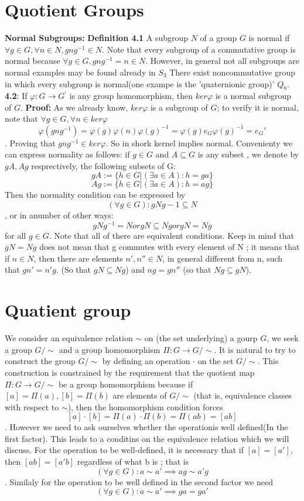 \section{Quotient Groups}
\textbf{Normal Subgroups:}
\textbf{Definition 4.1} A subgroup $N$ of a group $G$ is normal if $\forall g \in G, \forall n \in N, gng^{-1} \in N.$
Note that every subgroup of a commutative group is normal because
$\forall g \in G, gng^{-1} = n \in N$. However, in general not all subgroups are normal examples may be found already in $S_3$
There exist noncommutative group in which every subgroup is normal(one exampe is the 'quaternionic group)' $Q_8$.
\textbf{4.2}: If $\varphi : G \to G^\prime$ is any group homomorphism, then $ker\varphi$ is a normal subgroup of $G$.
\textbf{Proof:}
As we already know, $ker \varphi$ is a subgroup of $G$; to verify it is normal, note that $\forall g \in G, \forall n \in ker\varphi$
$$\varphi(gng^{-1}) = \varphi(g)\varphi(n)\varphi(g)^{-1} = \varphi(g)e_G\varphi(g)^{-1} = e_G\prime$$. Proving that $gng^{-1} \in ker\varphi$. So in shork kernel implies normal.
Convenienty we can express normality as follows: if $g\in G$ and $A \subseteq G $ is any subset , we denote by $gA,Ag$ resprectively, the following subsets of G:
$$gA := \{h\in G | (\exists a \in A): h = ga\}$$ $$Ag := \{h\in G | (\exists a \in A): h = ag\}$$
Then the normality condition can be expressed by $$(\forall g \in G): gNg-1 \subseteq N$$, or in anumber of other ways:
$$gNg^{-1} = N or  gN \subseteq Ng or gN = Ng$$ for all $g\in G$. Note that all of there are equivalent conditions. Keep in mind that $gN = Ng$ does not mean that g commutes with every element of N ; it means that if $n \in N$, then there are elements $n',n'' \in N$, in general different from n, such that $gn' = n'g$. (So that $gN \subseteq Ng$) and $ng = gn''$ (so that $Ng \subseteq gN$).

\section{Quatient group}
We consider an equivalence relation $\sim$ on (the set underlying) a gourp $G$, we seek a group $G/\sim$ and a group homomorphism $\varPi : G \to G/\sim.$
It is natural to try to construct the group $G/\sim$ by defining an operation $\cdot$ on the set $G/\sim$. This construction is constrained by the requirement that the quotient map $\varPi: G \to G/\sim$ be a group homomorphism
because if $[a] = \varPi(a), [b] = \varPi(b)$ are elements of $G/\sim$ (that is, equivalence classes with respect to $\sim$), then the homomorphism condition forces
$$[a]\cdot [b] = \varPi(a) \cdot \varPi(b) = \varPi(ab) = [ab]$$. However we need to ask ourselves whether the operationis well defined(In the first factor). This leads to a conditins on the equivalence relation which we will discuss. For the operation to be well-defined, it is necessary that if $[a] = [a']$, then $[ab] = [a'b]$ regardless of what b is ; that is
$$(\forall g \in G): a \sim a' \implies ag \sim a'g$$. Similaly for the operation to be well defined in the second factor we need
$$(\forall g \in G): a \sim a' \implies ga = ga'$$

